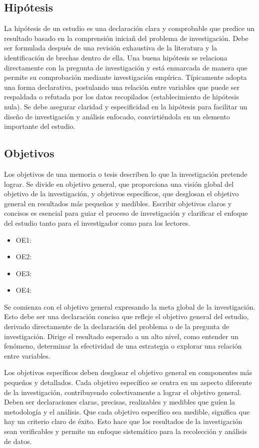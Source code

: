 \subsection{Hipótesis}
La hipótesis de un estudio es una declaración clara y comprobable que predice un resultado basado en la comprensión iniciañ del problema de investigación. Debe ser formulada después de una revisión exhaustiva de la literatura y la identificación de brechas dentro de ella. Una buena hipótesis se relaciona directamente con la pregunta de investigación y está enmarcada de manera que permite su comprobación mediante investigación empírica. Típicamente adopta una forma declarativa, postulando una relación entre variables que puede ser respaldada o refutada por los datos recopilados (establecimiento de hipótesis nula). Se debe asegurar claridad y especificidad en la hipótesis para facilitar un diseño de investigación y análisis enfocado, convirtiéndola en un elemento importante del estudio.

\subsection{Objetivos}
    Los objetivos de una memoria o tesis describen lo que la investigación pretende lograr. Se divide en objetivo general, que proporciona una visión global del objetivo de la investigación, y objetivos específicos, que desglosan el objetivo general en resultados más pequeños y medibles. Escribir objetivos claros y concisos es esencial para guiar el proceso de investigación y clarificar el enfoque del estudio tanto para el investigador como para los lectores.
\begin{itemize}
    \item OE1:
    \item OE2:
    \item OE3:
    \item OE4:

\end{itemize}  
Se comienza con el objetivo general expresando la meta global de la investigación. Esto debe ser una declaración concisa que refleje el objetivo general del estudio, derivado directamente de la declaración del problema o de la pregunta de investigación. Dirige el resultado esperado a un alto nivel, como entender un fenómeno, determinar la efectividad de una estrategia o explorar una relación entre variables.

Los objetivos específicos deben desglosar el objetivo general en componentes más pequeños y detallados. Cada objetivo específico se centra en un aspecto diferente de la investigación, contribuyendo colectivamente a lograr el objetivo general. Deben ser declaraciones claras, precisas, realizables y medibles que guíen la metodología y el análisis. Que cada objetivo específico sea medible, significa que hay un criterio claro de éxito. Esto hace que los resultados de la investigación sean verificables y permite un enfoque sistemático para la recolección y análisis de datos.

